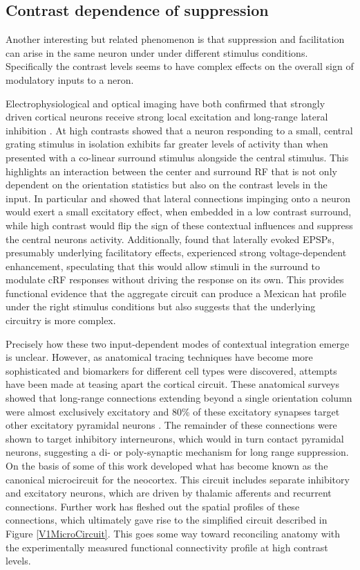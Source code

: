 \subsection{Contrast dependence of suppression}

Another interesting but related phenomenon is that suppression and
facilitation can arise in the same neuron under under different
stimulus conditions. Specifically the contrast levels seems to have
complex effects on the overall sign of modulatory inputs to a
neron.

Electrophysiological and optical imaging have both confirmed that
strongly driven cortical neurons receive strong local excitation and
long-range lateral inhibition \citep{Grinvald1994,Sceniak2001}. At
high contrasts \cite{Grinvald1994} showed that a neuron responding to
a small, central grating stimulus in isolation exhibits far greater
levels of activity than when presented with a co-linear surround
stimulus alongside the central stimulus. This highlights an
interaction between the center and surround RF that is not only
dependent on the orientation statistics but also on the contrast
levels in the input. In particular \cite{Hirsch1991} and
\cite{Weliky1995} showed that lateral connections impinging onto a
neuron would exert a small excitatory effect, when embedded in a low
contrast surround, while high contrast would flip the sign of these
contextual influences and suppress the central neurons
activity. Additionally, \cite{Hirsch1991} found that laterally evoked
EPSPs, presumably underlying facilitatory effects, experienced strong
voltage-dependent enhancement, speculating that this would allow
stimuli in the surround to modulate cRF responses without driving the
response on its own. This provides functional evidence that the
aggregate circuit can produce a Mexican hat profile under the right
stimulus conditions but also suggests that the underlying circuitry is
more complex.

Precisely how these two input-dependent modes of contextual
integration emerge is unclear. However, as anatomical tracing
techniques have become more sophisticated and biomarkers for different
cell types were discovered, attempts have been made at teasing apart
the cortical circuit. These anatomical surveys showed that long-range
connections extending beyond a single orientation column were almost
exclusively excitatory and 80\% of these excitatory synapses target
other excitatory pyramidal neurons
\citep{Hirsch1991,Kisvarday1997a}. The remainder of these connections
were shown to target inhibitory interneurons, which would in turn
contact pyramidal neurons, suggesting a di- or poly-synaptic mechanism
for long range suppression. On the basis of some of this work
\cite{Douglas1991} developed what has become known as the canonical
microcircuit for the neocortex. This circuit includes separate
inhibitory and excitatory neurons, which are driven by thalamic
afferents and recurrent connections. Further work has fleshed out the
spatial profiles of these connections, which ultimately gave rise to
the simplified circuit described in Figure \ref{V1MicroCircuit}. This
goes some way toward reconciling anatomy with the experimentally
measured functional connectivity profile at high contrast levels.


